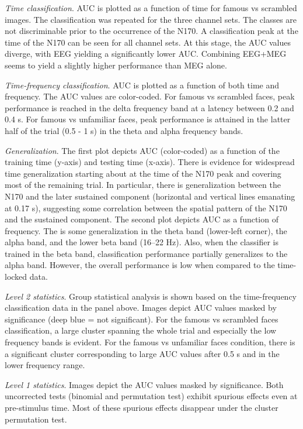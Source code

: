 \documentclass[utf8]{frontiersSCNS} %
\begin{document}
\textit{Time classification}. AUC is plotted as a function of time for famous vs scrambled images. The classification was repeated for the three channel sets. The classes are not discriminable prior to the occurrence of the N170. A classification peak at the time of the N170 can be seen for all channel sets. At this stage, the AUC values diverge, with EEG yielding a significantly lower AUC. Combining EEG+MEG seems to yield a slightly higher performance than MEG alone.

\textit{Time-frequency classification}. AUC is plotted as a function of both time and frequency. The AUC values are color-coded. For famous vs scrambled faces, peak performance is reached in the delta frequency band at a latency between 0.2 and 0.4 s. For famous vs unfamiliar faces, peak performance is attained in the latter half of the trial (0.5 - 1 s) in the theta and alpha frequency bands. 

\textit{Generalization}. The first plot depicts AUC (color-coded) as a function of the training time (y-axis) and testing time (x-axis). There is evidence for widespread time generalization starting about at the time of the N170 peak and covering most of the remaining trial. In particular, there is generalization between the N170 and the later sustained component (horizontal and vertical lines emanating at 0.17 s), suggesting some correlation between the spatial pattern of the N170 and the sustained component. 
The second plot depicts AUC as a function of frequency. The is some generalization in the theta band (lower-left corner), the alpha band, and the lower beta band (16--22 Hz). Also, when the classifier is trained in the beta band, classification performance partially generalizes to the alpha band. However, the overall performance is low when compared to the time-locked data. 

\textit{Level 2 statistics}. Group statistical analysis is shown based on the time-frequency classification data in the panel above. Images depict AUC values masked by significance (deep blue = not significant). For the famous vs scrambled faces classification, a large cluster spanning the whole trial and especially the low frequency bands is evident. For the famous vs unfamiliar faces condition, there is a significant  cluster corresponding to large AUC values after 0.5 s and in the lower frequency range.

\textit{Level 1 statistics}. Images depict the AUC values masked by significance. Both uncorrected tests (binomial and permutation test) exhibit spurious effects even at pre-stimulus time. Most of these spurious effects disappear under the cluster permutation test.
\end{document}
